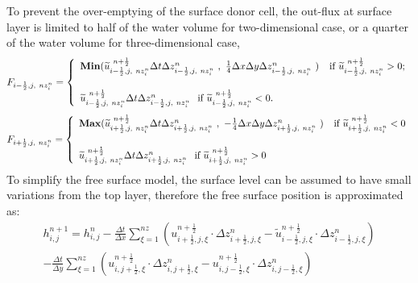 To prevent the over-emptying of the surface donor cell, the
out-flux at surface layer is limited to half of the water volume for two-dimensional case, or a quarter of the water volume for three-dimensional case,
\small
\begin{equation}
F_{i- \frac{1}{2} , j, \ nz^n_i}=\left\{
\begin{array}{ll}
\mathbf{Min}( \widetilde{u}_{i- \frac{1}{2},j,\ nz_i^n}^{\ n + \frac{1}{2}}
\Delta t\Delta z_{i- \frac{1}{2},j,\ nz_i^n}^n  \ , \ \frac{1}{4}
\Delta x \Delta y \Delta z_{i- \frac{1}{2},j,\ nz_i^n}^n \ )
\hspace{0.1in} \ \textrm{if} \ \widetilde{u}_{i- \frac{1}{2} ,j,\ nz_i^n}^{\ n
+ \frac{1}{2}} >0; \vspace{0.2in} \\
\widetilde{u}_{i- \frac{1}{2},j ,\ nz_i^n}^{\ n + \frac{1}{2}}  \Delta t\Delta z_{i- \frac{1}{2},j,\ nz_i^n}^n \hspace{0.1in} \textrm{if} \ \widetilde{u}_{i- \frac{1}{2},j,\ nz_i^n}^{\ n + \frac{1}{2}} <0. \\
\end{array}\right.
\end{equation}
\begin{equation}
F_{i+ \frac{1}{2},j, \ nz^n_i}=\left\{
\begin{array}{ll}
\mathbf{Max} ( \widetilde{u}_{i+ \frac{1}{2},j,\ nz_i^n}^{\ n +
\frac{1}{2}}  \Delta t\Delta z_{i+ \frac{1}{2},j,\ nz_i^n}^n \ , \
-\frac{1}{4} \Delta x \Delta y \Delta z_{i+ \frac{1}{2},j,\
nz_i^n}^n \ ) \hspace{0.1in} \ \textrm{if} \ \widetilde{u}_{i+ \frac{1}{2},j,\ nz_i^n}^{\ n + \frac{1}{2}} <0 \vspace{0.2in} \\
\widetilde{u}_{i+ \frac{1}{2},j,\ nz_i^n}^{\ n + \frac{1}{2}}  \Delta t \Delta z_{i+ \frac{1}{2},j,\ nz_i^n}^n \hspace{0.1in} \textrm{if} \ \widetilde{u}_{i+ \frac{1}{2},j,\ nz_i^n}^{\ n + \frac{1}{2}} >0 \\
\end{array}\right.
\end{equation} \normalsize
To simplify the free surface model, the surface level can be assumed to have small variations from the top layer, therefore the free surface position is approximated as:
\begin{eqnarray}
h_{i,j}^{n+1}=h_{i,j}^n - \frac{\Delta t}{\Delta x}
\sum_{\xi=1}^{nz} ( u_{i+ \frac{1}{2},j ,\xi}^{n +
\frac{1}{2}}  \cdot \Delta z_{i+ \frac{1}{2},j,\xi}^n -
\widetilde{u}_{i- \frac{1}{2},j,\xi}^{n + \frac{1}{2}}  \cdot
\Delta z_{i- \frac{1}{2},j , \xi}^n) \nonumber \\
- \frac{\Delta t}{\Delta y}
\sum_{\xi=1}^{nz} ( u_{i,j+ \frac{1}{2},\xi}^{n +
\frac{1}{2}}  \cdot \Delta z_{i,j+ \frac{1}{2},\xi}^n -
u_{i,j- \frac{1}{2},\xi}^{n + \frac{1}{2}}  \cdot
\Delta z_{i,j- \frac{1}{2}, \xi}^n)
\end{eqnarray}
